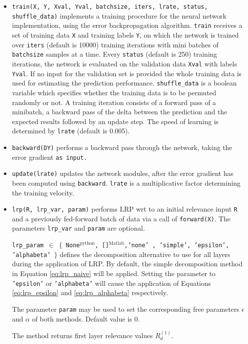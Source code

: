 \documentclass[a4wide]{article}
\newcommand{\mat}{$^\text{Matlab}$}
\newcommand{\py}{$^\text{python}$}
\begin{document}
\begin{itemize}
\begin{itemize}
\begin{itemize}
				\item \texttt{train(X, Y, Xval, Yval, batchsize, iters, lrate, status, shuffle\_data)} implements a training procedure for the neural network implementation, using the error backpropagation algorithm. \texttt{train} receives a set of training data \texttt{X}		 and training labels  \texttt{Y},   on which the network is trained over \texttt{iters} (default is 10000) training iterations with mini batches of \texttt{batchsize} samples at a time. Every \texttt{status} (default is 250) training iterations, the network is evaluated on the validation data \texttt{Xval} with labels \texttt{Yval}. If no input for the validation set is provided the whole training data is used for estimating the prediction performance. \texttt{shuffle\_data} is a boolean variable which specifies whether the training data is to be permuted randomly or not. A training iteration consists of a forward pass of a minibatch, a backward pass of the delta between the prediction and the expected results followed by an update step. The speed of learning is determined by \texttt{lrate} (default is 0.005).
				 \item \texttt{backward(DY)} performs a backward pass through the network, taking the error gradient \texttt{as input.}
				 \item \texttt{update(lrate)} updates the network modules, after the error gradient has been computed using \texttt{backward}. \texttt{lrate} is a multiplicative factor determining the training velocity.
				\item \texttt{lrp(R, lrp\_var, param)} performs LRP wrt to an initial relevance input \texttt{R} and a previously fed-forward batch of data via a call of \texttt{forward(X)}. The parameters \texttt{lrp\_var} and \texttt{param} are optional.
				
				\texttt{lrp\_param $\in$ $\lbrace$ None\py, []\mat,'none' , 'simple', 'epsilon', 'alphabeta' $\rbrace$} defines the decomposition alternative to use for all layers during the application of LRP. By default, the simple decomposition method in Equation \ref{eq:lrp_naive} will be applied. Setting the parameter to \texttt{'epsilon'} or \texttt{'alphabeta'} will cause the application of Equations \ref{eq:lrp_epsilon} and \ref{eq:lrp_alphabeta} respectively.
				
				The parameter \texttt{param} may be used to set the corresponding free parameters $\epsilon$ and $\alpha$ of both methods. Default value is $0$.
				
				The method returns first layer relevance values $R_d^{(1)}$.
				

\end{itemize}
\end{itemize}
\end{itemize}
\end{document}
